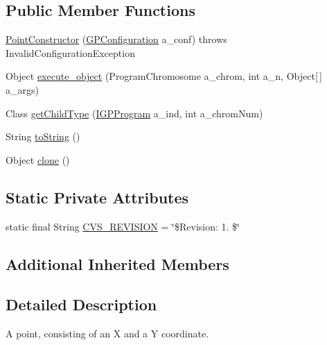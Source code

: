 \subsection*{Public Member Functions}
\begin{DoxyCompactItemize}
\item 
\hyperlink{classexamples_1_1gp_1_1monalisa_1_1core_1_1commands_1_1_point_constructor_a8dd655e70e0ae34e761b1356b180d9fd}{Point\-Constructor} (\hyperlink{classorg_1_1jgap_1_1gp_1_1impl_1_1_g_p_configuration}{G\-P\-Configuration} a\-\_\-conf)  throws Invalid\-Configuration\-Exception 
\item 
Object \hyperlink{classexamples_1_1gp_1_1monalisa_1_1core_1_1commands_1_1_point_constructor_acfa69b11abb5b46a3d0d10fc22a3b176}{execute\-\_\-object} (Program\-Chromosome a\-\_\-chrom, int a\-\_\-n, Object\mbox{[}$\,$\mbox{]} a\-\_\-args)
\item 
Class \hyperlink{classexamples_1_1gp_1_1monalisa_1_1core_1_1commands_1_1_point_constructor_a1ebe2207e84c6644a56fa721aa0e3387}{get\-Child\-Type} (\hyperlink{interfaceorg_1_1jgap_1_1gp_1_1_i_g_p_program}{I\-G\-P\-Program} a\-\_\-ind, int a\-\_\-chrom\-Num)
\item 
String \hyperlink{classexamples_1_1gp_1_1monalisa_1_1core_1_1commands_1_1_point_constructor_a64495240b58bb043a168a698952c43fd}{to\-String} ()
\item 
Object \hyperlink{classexamples_1_1gp_1_1monalisa_1_1core_1_1commands_1_1_point_constructor_a8f0bfa1597538f5abf4b94083b8bd0a2}{clone} ()
\end{DoxyCompactItemize}
\subsection*{Static Private Attributes}
\begin{DoxyCompactItemize}
\item 
static final String \hyperlink{classexamples_1_1gp_1_1monalisa_1_1core_1_1commands_1_1_point_constructor_a03b4de0abf3aa0206ed1b750759f1e8e}{C\-V\-S\-\_\-\-R\-E\-V\-I\-S\-I\-O\-N} = \char`\"{}\$Revision\-: 1. \$\char`\"{}
\end{DoxyCompactItemize}
\subsection*{Additional Inherited Members}


\subsection{Detailed Description}
A point, consisting of an X and a Y coordinate.

